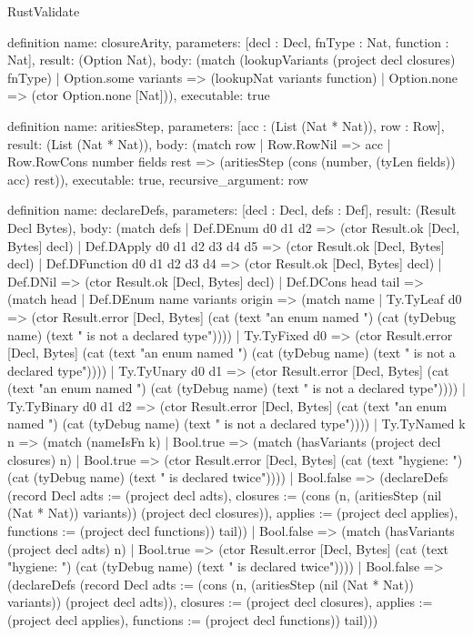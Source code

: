 \begin{lexlean}{RustValidate}
\begin{semanticmodule}
definition{
  name: closureArity,
  parameters: [decl : Decl, fnType : Nat, function : Nat],
  result: (Option Nat),
  body: (match (lookupVariants (project decl closures) fnType)
    | Option.some variants => (lookupNat variants function)
    | Option.none => (ctor Option.none [Nat])),
  executable: true
}

definition{
  name: aritiesStep,
  parameters: [acc : (List (Nat * Nat)), row : Row],
  result: (List (Nat * Nat)),
  body: (match row
    | Row.RowNil => acc
    | Row.RowCons number fields rest => (aritiesStep (cons (number, (tyLen fields)) acc) rest)),
  executable: true,
  recursive_argument: row
}

definition{
  name: declareDefs,
  parameters: [decl : Decl, defs : Def],
  result: (Result Decl Bytes),
  body: (match defs
    | Def.DEnum d0 d1 d2 => (ctor Result.ok [Decl, Bytes] decl)
    | Def.DApply d0 d1 d2 d3 d4 d5 => (ctor Result.ok [Decl, Bytes] decl)
    | Def.DFunction d0 d1 d2 d3 d4 => (ctor Result.ok [Decl, Bytes] decl)
    | Def.DNil => (ctor Result.ok [Decl, Bytes] decl)
    | Def.DCons head tail => (match head
      | Def.DEnum name variants origin => (match name
        | Ty.TyLeaf d0 => (ctor Result.error [Decl, Bytes] (cat (text "an enum named ") (cat (tyDebug name) (text " is not a declared type"))))
        | Ty.TyFixed d0 => (ctor Result.error [Decl, Bytes] (cat (text "an enum named ") (cat (tyDebug name) (text " is not a declared type"))))
        | Ty.TyUnary d0 d1 => (ctor Result.error [Decl, Bytes] (cat (text "an enum named ") (cat (tyDebug name) (text " is not a declared type"))))
        | Ty.TyBinary d0 d1 d2 => (ctor Result.error [Decl, Bytes] (cat (text "an enum named ") (cat (tyDebug name) (text " is not a declared type"))))
        | Ty.TyNamed k n => (match (nameIsFn k)
          | Bool.true => (match (hasVariants (project decl closures) n)
            | Bool.true => (ctor Result.error [Decl, Bytes] (cat (text "hygiene: ") (cat (tyDebug name) (text " is declared twice"))))
            | Bool.false => (declareDefs (record Decl {adts := (project decl adts), closures := (cons (n, (aritiesStep (nil (Nat * Nat)) variants)) (project decl closures)), applies := (project decl applies), functions := (project decl functions)}) tail))
          | Bool.false => (match (hasVariants (project decl adts) n)
            | Bool.true => (ctor Result.error [Decl, Bytes] (cat (text "hygiene: ") (cat (tyDebug name) (text " is declared twice"))))
            | Bool.false => (declareDefs (record Decl {adts := (cons (n, (aritiesStep (nil (Nat * Nat)) variants)) (project decl adts)), closures := (project decl closures), applies := (project decl applies), functions := (project decl functions)}) tail)))
}
\end{semanticmodule}
\end{lexlean}
